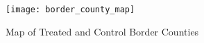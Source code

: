 \begin{figure}[H]
    \centering
    \texttt{[image: border\_county\_map]}
    \caption{Map of Treated and Control Border Counties}
    \label{fig:border-county-map}
\end{figure}